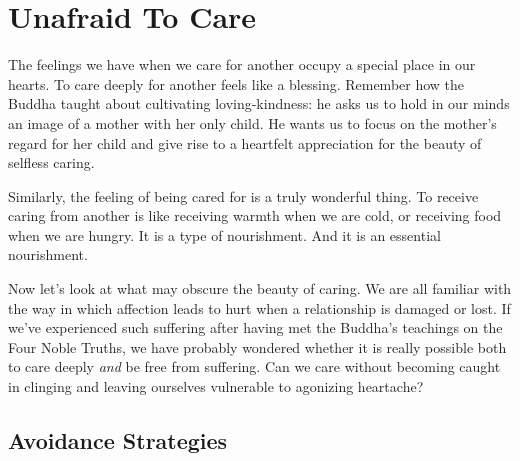 
\chapter{Unafraid To Care}


The feelings we have when we care for another occupy a special place in
our hearts. To care deeply for another feels like a blessing. Remember
how the Buddha taught about cultivating loving-kindness: he asks us to
hold in our minds an image of a mother with her only child. He wants us
to focus on the mother’s regard for her child and give rise to a
heartfelt appreciation for the beauty of selfless caring.

Similarly, the feeling of being cared for is a truly wonderful thing. To
receive caring from another is like receiving warmth when we are cold,
or receiving food when we are hungry. It is a type of nourishment. And
it is an essential nourishment.

Now let’s look at what may obscure the beauty of caring. We are all
familiar with the way in which affection leads to hurt when a
relationship is damaged or lost. If we’ve experienced such suffering
after having met the Buddha’s teachings on the Four Noble
Truths\cite{four-noble-truths},
we have probably wondered whether it is really possible both to care deeply
\emph{and} be free from suffering. Can we care without becoming caught in
clinging and leaving ourselves vulnerable to agonizing heartache?

\section{Avoidance Strategies}

